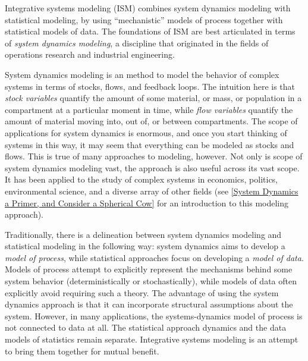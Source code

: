 
Integrative systems modeling (ISM) combines system dynamics modeling
with statistical modeling, by using ``mechanistic'' models of
process together with statistical models of data.  The
foundations of ISM are best articulated in terms of \emph{system
  dynamics modeling}, a discipline that originated in the fields of
operations research and industrial engineering.

System dynamics modeling is an method to model the behavior of complex
systems in terms of stocks, flows, and feedback loops.  The intuition
here is that \emph{stock variables} quantify the amount of some
material, or mass, or population in a compartment at a particular
moment in time, while \emph{flow variables} quantify the amount of
material moving into, out of, or between compartments. The scope of
applications for system dynamics is enormous, and once you start
thinking of systems in this way, it may seem that everything can be
modeled as stocks and flows.  This is true of many approaches to
modeling, however.  Not only is scope of system dynamics modeling
vast, the approach is also useful across its vast scope. It has been
applied to the study of complex systems in economics, politics,
environmental science, and a diverse array of other fields (see
\ref{System Dynamics a Primer, and Consider a Spherical Cow} for an
introduction to this modeling approach).

Traditionally, there is a delineation between system dynamics modeling
and statistical modeling in the following way: system dynamics aims to
develop a \emph{model of process}, while statistical approaches focus
on developing a \emph{model of data}. Models of process attempt to
explicitly represent the mechanisms behind some system behavior
(deterministically or stochastically), while models of data often
explicitly avoid requiring such a theory. The advantage of using the
system dynamics approach is that it can incorporate structural
assumptions about the system.  However, in many applications, the
systems-dynamics model of process is not connected to data at all.  The statistical approach  dynamics
and the data models of statistics remain separate.  Integrative
systems modeling is an attempt to bring them together for mutual
benefit.

